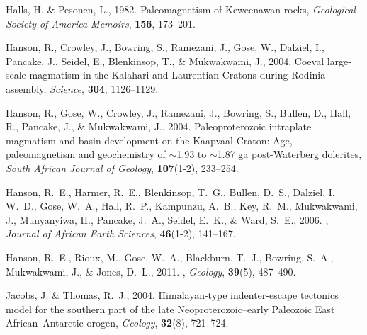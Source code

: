\documentclass[11pt,letterpaper]{article}
\begin{document}
\begin{thebibliography}{49}
Halls, H. \& Pesonen, L., 1982.
\newblock Paleomagnetism of {K}eweenawan rocks, {\it Geological Society of
  America Memoirs\/}, {\bf 156}, 173--201.

Hanson, R., Crowley, J., Bowring, S., Ramezani, J., Gose, W., Dalziel, I.,
  Pancake, J., Seidel, E., Blenkinsop, T., \& Mukwakwami, J.,
  2004{}.
\newblock Coeval large-scale magmatism in the {K}alahari and {L}aurentian
  {C}ratons during {R}odinia assembly, {\it Science\/}, {\bf 304}, 1126--1129.

Hanson, R., Gose, W., Crowley, J., Ramezani, J., Bowring, S., Bullen, D., Hall,
  R., Pancake, J., \& Mukwakwami, J., 2004{}.
\newblock Paleoproterozoic intraplate magmatism and basin development on the
  {K}aapvaal {C}raton: Age, paleomagnetism and geochemistry of $\sim$1.93 to
  $\sim$1.87 ga post-{W}aterberg dolerites, {\it South African Journal of
  Geology\/}, {\bf 107}(1-2), 233--254.

Hanson, R.~E., Harmer, R.~E., Blenkinsop, T.~G., Bullen, D.~S., Dalziel, I.
  W.~D., Gose, W.~A., Hall, R.~P., Kampunzu, A.~B., Key, R.~M., Mukwakwami, J.,
  Munyanyiwa, H., Pancake, J.~A., Seidel, E.~K., \& Ward, S.~E., 2006.
, {\it Journal of African Earth Sciences\/}, {\bf 46}(1-2), 141--167.

Hanson, R.~E., Rioux, M., Gose, W.~A., Blackburn, T.~J., Bowring, S.~A.,
  Mukwakwami, J., \& Jones, D.~L., 2011.
, {\it Geology\/}, {\bf 39}(5), 487--490.

Jacobs, J. \& Thomas, R.~J., 2004.
\newblock Himalayan-type indenter-escape tectonics model for the southern part
  of the late {Neoproterozoic--early Paleozoic East African--Antarctic orogen},
  {\it Geology\/}, {\bf 32}(8), 721--724.


\end{thebibliography}
\end{document}
